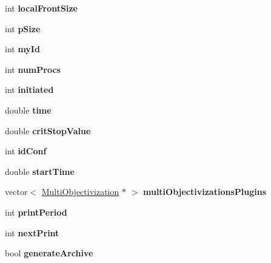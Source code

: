 \begin{DoxyCompactItemize}
\item 
\mbox{\label{classEA_add005610c438f386a0e1297f40f99294}} 
int {\bfseries local\+Front\+Size}
\item 
\mbox{\label{classEA_a28ab3bae229219bcf7ea0d8a03ce78d5}} 
int {\bfseries p\+Size}
\item 
\mbox{\label{classEA_ac58dd64188e1481baaa9df911026836a}} 
int {\bfseries my\+Id}
\item 
\mbox{\label{classEA_a960f7ddfe7f2c8aacc1d08bfb9a7c606}} 
int {\bfseries num\+Procs}
\item 
\mbox{\label{classEA_a12f5674b1b1eb20b47ad4849247239ea}} 
int {\bfseries initiated}
\item 
\mbox{\label{classEA_a76be177471c03a1c37b2e562d0ad51cf}} 
double {\bfseries time}
\item 
\mbox{\label{classEA_af18fabb320c08ef9de16fd9877272211}} 
double {\bfseries crit\+Stop\+Value}
\item 
\mbox{\label{classEA_a586553aca80fde73642542a1b41bd255}} 
int {\bfseries id\+Conf}
\item 
\mbox{\label{classEA_a224d5617597ad16e7a90e3004ade9a11}} 
double {\bfseries start\+Time}
\item 
\mbox{\label{classEA_a40edcfb8016401e5ea73b8188731026b}} 
vector$<$ \mbox{\hyperlink{classMultiObjectivization}{Multi\+Objectivization}} $\ast$ $>$ {\bfseries multi\+Objectivizations\+Plugins}
\item 
\mbox{\label{classEA_aded32463840cd4ac457949fa6c9c3f98}} 
int {\bfseries print\+Period}
\item 
\mbox{\label{classEA_a8815427bc9aafb995f6a3ecb4aa0c52b}} 
int {\bfseries next\+Print}
\item 
\mbox{\label{classEA_a13a8479041c0f19c8b992ddca9ce9fc6}} 
bool {\bfseries generate\+Archive}
\end{DoxyCompactItemize}

